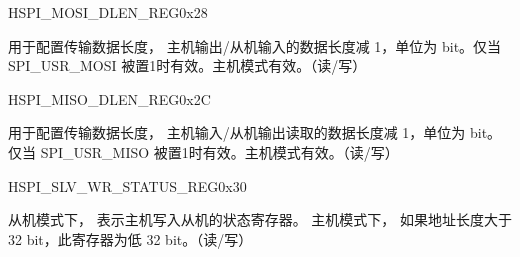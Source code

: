\begin{register}{H}{SPI\_MOSI\_DLEN\_REG}{0x28}\label{regdesc:SPIMOSIDLENREG}
%
%
\regnewline%
\begin{regdesc}\begin{reglist}
\item [SPI\_USR\_MOSI\_DBITLEN] 用于配置传输数据长度， 主机输出/从机输入的数据长度减 1，单位为 bit。仅当 SPI\_USR\_MOSI 被置1时有效。主机模式有效。（读/写）
\end{reglist}\end{regdesc}
\end{register}


\begin{register}{H}{SPI\_MISO\_DLEN\_REG}{0x2C}\label{regdesc:SPIMISODLENREG}
%
%
\regnewline%
\begin{regdesc}\begin{reglist}
\item [SPI\_USR\_MISO\_DBITLEN] 用于配置传输数据长度， 主机输入/从机输出读取的数据长度减 1，单位为 bit。仅当 SPI\_USR\_MISO 被置1时有效。主机模式有效。（读/写）
\end{reglist}\end{regdesc}
\end{register}


\begin{register}{H}{SPI\_SLV\_WR\_STATUS\_REG}{0x30}\label{regdesc:SPISLVWRSTATUSREG}
%
\regnewline%
\begin{regdesc}\begin{reglist}
\item [SPI\_SLV\_WR\_STATUS\_REG] 从机模式下， 表示主机写入从机的状态寄存器。 主机模式下， 如果地址长度大于32 bit，此寄存器为低 32 bit。（读/写）
\end{reglist}\end{regdesc}
\end{register}


